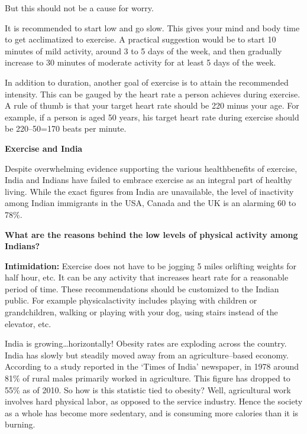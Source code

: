 But this should not be a cause for worry.

It is recommended to start low and go slow. This gives your mind and body time to get acclimatized to exercise. A practical suggestion would be to start 10 minutes of mild activity, around 3 to 5 days of the week, and then gradually increase to 30 minutes of moderate activity for at least 5 days of the week.

In addition to duration, another goal of exercise is to attain the recommended intensity. This can be gauged by the heart rate a person achieves during exercise. A rule of thumb is that your target heart rate should be 220 minus your age. For example, if a person is aged 50 years, his target heart rate during exercise should be 220–50=170 beats per minute.

\noindent\textbf{Exercise and India}

Despite overwhelming evidence supporting the various health\break benefits of exercise, India and Indians have failed to embrace exercise as an integral part of healthy living. While the exact figures from India are unavailable, the level of inactivity among Indian immigrants in the USA, Canada and the UK is an alarming 60 to 78\%.

\clearpage

\noindent\textbf{What are the reasons behind the low levels of physical activity among Indians?}
\vskip 10pt

\textbf{Intimidation:} Exercise does not have to be jogging 5 miles or\break lifting weights for half hour, etc. It can be any activity that increases heart rate for a reasonable period of time. These recommendations should be customized to the Indian public. For example physical\break activity includes playing with children or grandchildren, walking or playing with your dog, using stairs instead of the elevator, etc.

India is growing…horizontally! Obesity rates are exploding across the country. India has slowly but steadily moved away from an agri\-cul\-ture–based economy. According to a study reported in the ‘Times of India’ newspaper, in 1978 around 81\% of rural males primarily worked in agriculture. This figure has dropped to 55\% as of 2010. So how is this statistic tied to obesity? Well, agricultural work involves hard physical labor, as opposed to the service industry. Hence the society as a whole has become more sedentary, and is consuming more calories than it is burning.

\vskip 10pt

